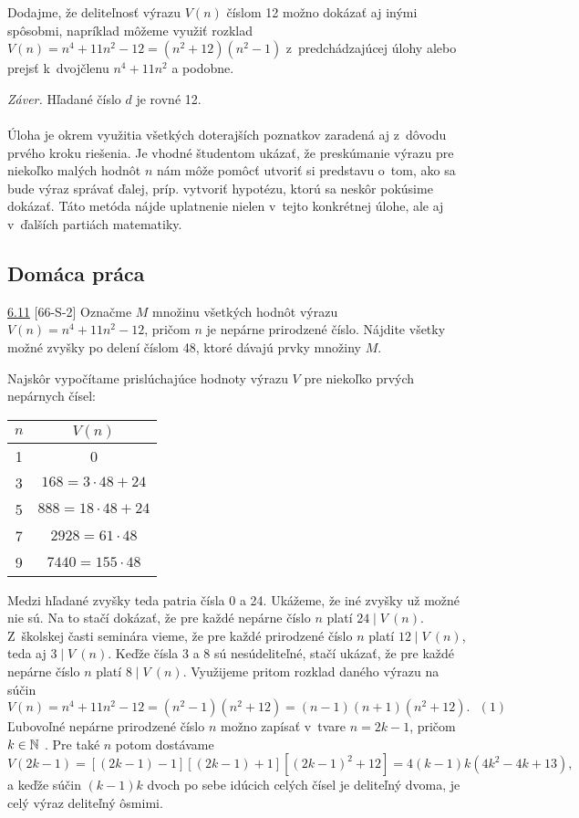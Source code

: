 Dodajme, že deliteľnosť výrazu $V (n)$ číslom 12 možno dokázať aj inými spôsobmi, napríklad môžeme využiť rozklad $V (n) = n^4+ 11n^2 - 12 = (n^2+ 12)(n^2 - 1)$ z~predchádzajúcej úlohy alebo prejsť k~dvojčlenu $n^4 + 11n^2$ a podobne.

\textit{Záver.} Hľadané číslo $d$ je rovné 12.\\
\\
\kom Úloha je okrem využitia všetkých doterajších poznatkov zaradená aj z~dôvodu prvého kroku riešenia. Je vhodné študentom ukázať, že preskúmanie výrazu pre niekoľko malých hodnôt $n$ nám môže pomôcť utvoriť si predstavu o~tom, ako sa bude výraz správať ďalej, príp. vytvoriť hypotézu, ktorú sa neskôr pokúsime dokázať. Táto metóda nájde uplatnenie nielen v~tejto konkrétnej úlohe, ale aj v~ďalších partiách matematiky.\\

\subsection*{Domáca práca}
\begin{tcolorbox}[breakable,notitle,boxrule=0pt,colback=light-gray,colframe=light-gray]\ul{6.11} [66-S-2]
Označme $M$ množinu všetkých hodnôt výrazu $V (n) = n^4 + 11n^2 - 12$, pričom $n$ je nepárne prirodzené číslo. Nájdite všetky možné zvyšky po delení číslom 48, ktoré dávajú prvky množiny $M$.

\end{tcolorbox}

\rieh Najskôr vypočítame prislúchajúce hodnoty výrazu $V$ pre niekoľko prvých nepárnych čísel:
\begin{center}
\begin{tabular}{c c}
$n$ & $V (n)$\\
\hline
1 & 0\\
3 & $168 = 3 \cdot 48 + 24$ \\
5 & $888 = 18 \cdot 48 + 24$ \\
7 & $2928 = 61 \cdot 48$\\
9 & $7440 = 155 \cdot 48$
\end{tabular}
\end{center}

Medzi hľadané zvyšky teda patria čísla 0 a 24. Ukážeme, že iné zvyšky už možné nie sú. Na to stačí dokázať, že pre každé nepárne číslo $n$ platí $24 \mid V~(n)$. Z~školskej časti seminára vieme, že pre každé prirodzené číslo $n$ platí $12 \mid V~(n)$, teda aj $3 \mid V~(n)$. Keďže čísla 3 a 8 sú nesúdeliteľné, stačí ukázať, že pre každé nepárne číslo $n$ platí $8 \mid V~(n)$. Využijeme
pritom rozklad daného výrazu na súčin
$$V (n) = n^4+ 11n^2 - 12 = (n^2 - 1)(n^2+ 12) = (n - 1)(n + 1)(n^2+ 12). \ \ \ (1)$$
Ľubovoľné nepárne prirodzené číslo $n$ možno zapísať v~tvare $n = 2k - 1$, pričom $k \in \mathbb{N}$ . Pre také $n$ potom dostávame
$$V (2k - 1) = [(2k - 1) - 1][(2k - 1) + 1][(2k - 1)^2
+ 12] = 4(k - 1)k(4k^2 - 4k + 13),$$
a keďže súčin $(k - 1)k$ dvoch po sebe idúcich celých čísel je deliteľný dvoma, je celý výraz deliteľný ôsmimi.

